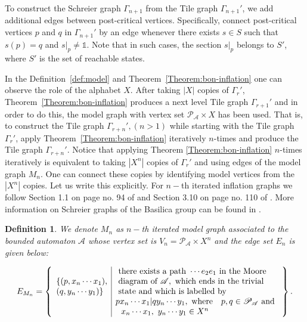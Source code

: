 \documentclass{article}
\newtheorem{mydef}{Definition}[section]
\newcommand{\A}{\mathcal{A}}
\newcommand{\G}{\Gamma}
\newcommand{\id}{\mathds{1}}
\newcommand{\pc}{\mathscr{P}_{\A}}
\begin{document}
To construct the Schreier graph $\G_{n+1}$ from the Tile graph $\G_{n+1}'$, we add additional edges between post-critical vertices. Specifically, connect post-critical vertices $p$ and $q$ in $\G_{n+1}'$ by an edge whenever there exists $s \in S$ such that $s(p) = q$ and $s|_p \ne \id$. Note that in such cases, the section $s|_p$ belongs to $S'$, where $S'$ is the set of reachable states.

In the Definition~\ref{def:model} and Theorem~\ref{Theorem:bon-inflation} one can observe the role of the alphabet $X$. After taking $|X|$ copies of $\G_r'$, Theorem~\ref{Theorem:bon-inflation} produces a next level Tile graph $\G_{r+1}'$ and in order to do this, the model graph with vertex set $\pc\times X$ has been used. That is, to construct the Tile graph $\G_{r+n}', (n > 1)$ while starting with the Tile graph $\G_r'$, apply Theorem~\ref{Theorem:bon-inflation} iteratively $n$-times and produce the Tile graph $\G_{r+n}'$. Notice that applying Theorem  \ref{Theorem:bon-inflation} $n$-times iteratively is equivalent to taking $|X^n|$ copies of $\G_r'$ and using edges of the model graph $M_n$. One can connect these copies by identifying model vertices from the $|X^n|$ copies. Let us write this explicitly. For $n-$th iterated inflation graphs we follow Section 1.1 on page no. 94 of \cite{bondarenko2007groups} and Section 3.10 on page no. 110 of \cite{nekrashevych2005self}. More information on Schreier graphs of the Basilica group can be found in \cite{D'angeli2010167}. 
\begin{mydef} \label{def:nth-model} We denote $M_n$ as $n-$th iterated model graph associated to the bounded automaton $\A$ whose vertex set is $V_n = \mathcal{P_A} \times X^n$ and the edge set $E_n$ is given below:
\end{mydef}
\begin{eqnarray}
\label{Equation:model-edges}
E_{M_n} = \left\lbrace \begin{array}{l | l}
& \textnormal{ there exists a path } \cdots e_2e_1 \textnormal{ in the Moore } \\
\{(p,x_n \cdots x_1), & \textnormal{ diagram of } \A, \textnormal{ which ends in the trivial }\\
(q,y_n \cdots y_1)\} & \textnormal{ state and which is labelled by }\\
& px_n \cdots x_1|qy_n \cdots y_1, \textnormal{ where } ~~p,q \in \mathcal{P_A} \textnormal{ and } \\
&~~x_n \cdots x_1, ~y_n \cdots y_1 \in X^n \end{array} \right\rbrace.
\end{eqnarray}
\end{document}
